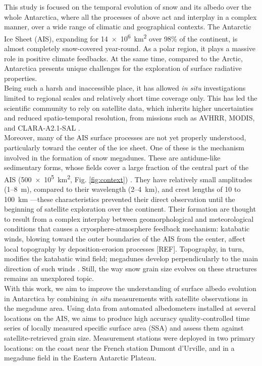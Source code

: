 \documentclass[11pt,a4paper]{article}
\begin{document}
	This study is focused on the temporal evolution of snow and its albedo over the whole Antarctica, where all the processes of above act and interplay in a complex manner, over a wide range of climatic and geographical contexts. The Antarctic Ice Sheet (AIS), expanding for \qty{14e6}{\kilo\meter\squared} over 98\% of the continent, is almost completely snow-covered year-round. As a polar region, it plays a massive role in positive climate feedbacks. At the same time, compared to the Arctic, Antarctica presents unique challenges for the exploration of surface radiative properties.\\
	Being such a harsh and inaccessible place, it has  allowed \emph{in situ} investigations limited to regional scales and relatively short time coverage only. This has led the scientific community to rely on satellite data, which inherits higher uncertainties and reduced spatio-temporal resolution, from missions such as AVHRR, MODIS, and CLARA-A2.1-SAL \parencite{callejaSnowAlbedoSeasonality2019, sunChangesAntarcticsSummer2023a}.\\
	Moreover, many of the AIS surface processes are not yet properly understood, particularly toward the center of the ice sheet. One of these is the mechanism involved in the formation of snow megadunes. These are antidune-like sedimentary forms, whose fields cover a large fraction of the central part of the AIS (\qty{500e5}{\kilo\meter\squared}, Fig. \ref{fig:context}) \parencite{frezzottiSnowMegadunesAntarctica2002}. They have relatively small amplitudes (1--\qty{8}{\meter}), compared to their wavelength (2--\qty{4}{\kilo\meter}), and crest lengths of 10 to \qty{100}{\kilo\meter} \parencite{fahnestockSnowMegaduneFields2000}---these characteristics prevented their direct observation until the beginning of satellite exploration over the continent. Their formation are thought to result from a complex interplay between geomorphological and meteorological conditions that causes a cryosphere-atmosphere feedback mechanism: katabatic winds, blowing toward the outer boundaries of the AIS from the center, affect local topography by deposition-erosion processes [REF]. Topography, in turn, modifies the katabatic wind field; megadunes develop perpendicularly to the main direction of such winds \parencite{traversaMegadunesAntarcticaMigration2023}. Still, the way snow grain size evolves on these structures remains an unexplored topic.\\
	With this work, we aim to improve the understanding of surface albedo evolution in Antarctica by combining \emph{in situ} measurements with satellite observations in the megadune area. Using data from automated albedometers installed at several locations on the AIS, we aims to produce high accuracy quality-controlled time series of locally measured specific surface area (SSA) and assess them against satellite-retrieved grain size. Measurement stations were deployed in two primary locations: on the coast near the French station Dumont d'Urville, and in a megadune field in the Eastern Antarctic Plateau.
	
\end{document}
